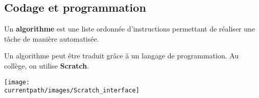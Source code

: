 \begin{changemargin}{-10mm}{-15mm}
   \section{Codage et programmation}
      \begin{definition}
         Un {\bf algorithme} est une liste ordonnée d'instructions permettant
      de réaliser une tâche de manière automatisée.
      \end{definition}            
      Un algorithme peut être traduit grâce à un langage de programmation. Au collège, on utilise {\bf Scratch}.      
      \begin{center}
         \texttt{[image: \\currentpath/images/Scratch\_interface]}
      \end{center}
\end{changemargin}
   
